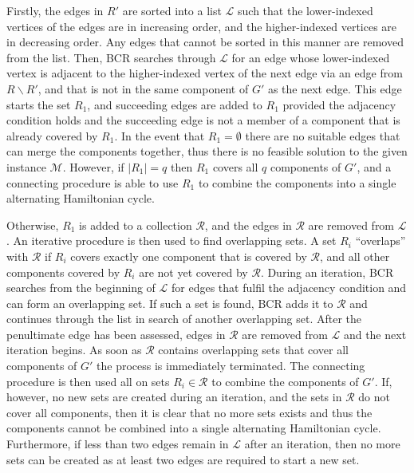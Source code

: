 \documentclass{elsarticle}
\begin{document}
Firstly, the edges in $R'$ are sorted into a list $\mathcal{L}$ such that the lower-indexed vertices of the edges are in increasing order, and the higher-indexed vertices are in decreasing order. Any edges that cannot be sorted in this manner are removed from the list. Then, BCR searches through $\mathcal{L}$ for an edge whose lower-indexed vertex is adjacent to the higher-indexed vertex of the next edge via an edge from $R \backslash R'$, and that is not in the same component of $G'$ as the next edge. This edge starts the set $R_1$, and succeeding edges are added to $R_1$ provided the adjacency condition holds and the succeeding edge is not a member of a component that is already covered by $R_1$. In the event that $R_1 = \emptyset$ there are no suitable edges that can merge the components together, thus there is no feasible solution to the given instance $\mathcal{M}$. However, if $|R_1| = q$ then $R_1$ covers all $q$ components of $G'$, and a connecting procedure is able to use $R_1$ to combine the components into a single alternating Hamiltonian cycle.

Otherwise, $R_1$ is added to a collection $\mathcal{R}$, and the edges in $\mathcal{R}$ are removed from $\mathcal{L}$. An iterative procedure is then used to find overlapping sets. A set $R_i$ ``overlaps'' with $\mathcal{R}$ if $R_i$ covers exactly one component that is covered by $\mathcal{R}$, and all other components covered by $R_i$ are not yet covered by $\mathcal{R}$. During an iteration, BCR searches from the beginning of $\mathcal{L}$ for edges that fulfil the adjacency condition and can form an overlapping set. If such a set is found, BCR adds it to $\mathcal{R}$ and continues through the list in search of another overlapping set. After the penultimate edge has been assessed, edges in $\mathcal{R}$ are removed from $\mathcal{L}$ and the next iteration begins. As soon as $\mathcal{R}$ contains overlapping sets that cover all components of $G'$ the process is immediately terminated. The connecting procedure is then used all on sets $R_i \in \mathcal{R}$ to combine the components of $G'$. If, however, no new sets are created during an iteration, and the sets in $\mathcal{R}$ do not cover all components, then it is clear that no more sets exists and thus the components cannot be combined into a single alternating Hamiltonian cycle. Furthermore, if less than two edges remain in $\mathcal{L}$ after an iteration, then no more sets can be created as at least two edges are required to start a new set. 
\end{document}
